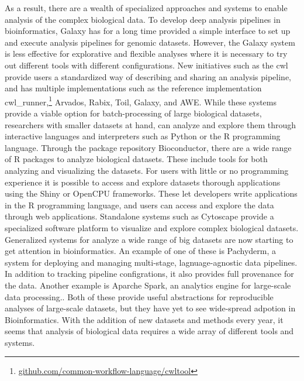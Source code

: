 As a result, there are a wealth of specialized approaches and systems 
to enable
analysis of the complex biological data. To develop deep analysis pipelines in
bioinformatics, Galaxy\cite{galaxy} has for a long time provided a simple
interface to set up and execute analysis pipelines for genomic datasets.
However, the Galaxy system is less effective for explorative and flexible
analyses where it is necessary 
to try out different tools with different
configurations.\cite{spjuth2015experiences} New initiatives such as the
\gls{cwl} provide users a standardized way of describing and sharing an analysis
pipeline, and has multiple implementations such as the reference implementation
cwl\_runner,\footnote{\url{github.com/common-workflow-language/cwltool}}
Arvados,\cite{arvados} Rabix,\cite{rabix} Toil,\cite{toil} Galaxy,\cite{galaxy}
and AWE.\cite{awe}
While these systems provide a viable option for batch-processing of
large biological datasets, researchers with smaller datasets at hand, can
analyze and explore them through interactive languages and interpreters such as
Python or the  R programming language. Through the package repository
Bioconductor, there are a wide range of R packages to analyze biological
datasets. These include tools for both analyzing and visualizing the datasets.
For users with little or no programming experience it is possible to access and
explore datasets thorough applications using the Shiny or OpenCPU frameworks.
These let developers write applications in the R programming language, and users
can access and explore the data through web applications. Standalone systems
such as Cytoscape provide a specialized software platform to visualize and
explore complex biological datasets.\cite{cytoscape} 
Generalized systems for analyze a wide range of big datasets are now starting to
get attention in bioinformatics. An example of one of these is Pachyderm, a
system for deploying and managing multi-stage, lagnuage-agnostic data
pipelines.\cite{pachyderm} In addition to tracking pipeline configrations,
it also provides full provenance for the data.
Another example is Aparche Spark, an analytics engine for large-scale data
processing.\cite{spark}. Both of these provide useful abstractions for
reproducible analyses of large-scale datasets, but they have yet to see
wide-spread adpotion in Bioinformatics.  
With the addition of new datasets and methods every year, it seems that analysis
of biological data requires a wide array of different tools and systems.

